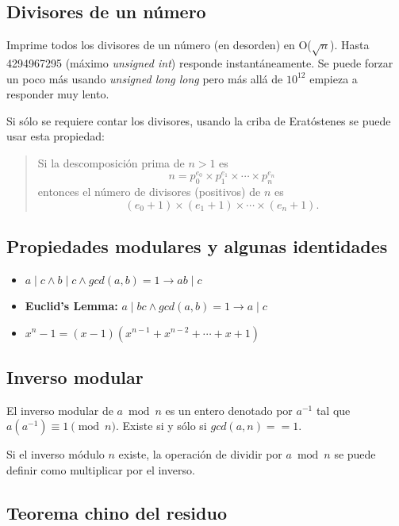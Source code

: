 \documentclass[10pt,letterpaper,twocolumn]{article}
\newcommand{\codigofuente}[1]{

\dotfill
}
\begin{document}
\subsection{Divisores de un número}
Imprime todos los divisores de un número (en desorden) en O($\sqrt{n}$).
Hasta 4294967295 (máximo \textit{unsigned int}) responde instantáneamente. Se puede
forzar un poco más usando \textit{unsigned long long} pero más allá de $10^{12}$ empieza a
responder muy lento.
\codigofuente{./src/teoria_de_numeros/divisores.cpp}

Si sólo se requiere contar los divisores, usando la criba de Eratóstenes se puede usar esta propiedad:
\begin{quote}
Si la descomposición prima de $n > 1$ es $$n = p_0^{e_0} \times p_1^{e_1} \times \cdots \times p_{n}^{e_n}$$ entonces el número de divisores (positivos) de $n$ es $$(e_0 + 1) \times (e_1 + 1) \times \cdots \times (e_n + 1).$$
\end{quote}


\subsection{Propiedades modulares y algunas identidades}

\begin{itemize}
  \item $ a \mid c \land b \mid c \land gcd(a, b) = 1 \rightarrow ab \mid c $
  \item \textbf{Euclid's Lemma:}  $ a \mid bc \land gcd(a, b) = 1 \rightarrow a \mid c $
  \item $ x^n - 1 = (x - 1)(x^{n - 1} + x^{n - 2} + \cdots + x + 1) $
\end{itemize}

\subsection{Inverso modular}

El inverso modular de $a \bmod{n}$ es un entero denotado por $a^{-1}$ tal que $a (a^{-1}) \equiv 1 \pmod{n}$. Existe si y sólo si $gcd(a, n) == 1$.

Si el inverso módulo $n$ existe, la operación de dividir por $a \bmod{n}$ se puede definir como multiplicar por el inverso.

\codigofuente{./src/teoria_de_numeros/inverso_modular.cpp}

\subsection{Teorema chino del residuo}
\end{document}
